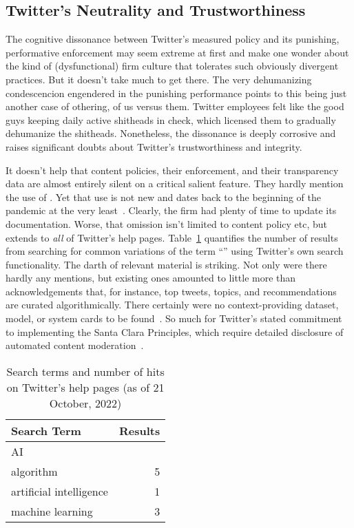 \subsection{Twitter's Neutrality and Trustworthiness}
\label{sec:trusting-twitter}

The cognitive dissonance between Twitter's measured policy and its punishing,
performative enforcement may seem extreme at first and make one wonder about the
kind of (dysfunctional) firm culture that tolerates such obviously divergent
practices. But it doesn't take much to get there. The very dehumanizing
condescencion engendered in the punishing performance points to this being just
another case of othering, of us versus them. Twitter employees felt like the
good guys keeping daily active shitheads in check, which licensed them to
gradually dehumanize the shitheads. Nonetheless, the dissonance is deeply
corrosive and raises significant doubts about Twitter's trustworthiness and
integrity.

It doesn't help that content policies, their enforcement, and their transparency
data are almost entirely silent on a critical salient feature. They hardly
mention the use of . Yet that use is not new and dates back to the
beginning of the pandemic at the very least~\cite{ScottKayali2020}. Clearly, the
firm had plenty of time to update its documentation. Worse, that omission isn't
limited to content policy etc, but extends to \emph{all} of Twitter's help
pages. Table~\ref{table:search} quantifies the number of results from searching
for common variations of the term ``'' using Twitter's own search
functionality. The darth of relevant material is striking. Not only were there
hardly any mentions, but existing ones amounted to little more than
acknowledgements that, for instance, top tweets, topics, and recommendations are
curated algorithmically. There certainly were no context-providing dataset,
model, or system cards to be
found~\cite{GebruMorgensternea2021,MitchellWuea2019,ProcopeCheemaea2022}. So
much for Twitter's stated commitment to
implementing the Santa Clara Principles, which require detailed disclosure of
automated content
moderation~\cite{AccessNowACLUFoundationOfNorthernCaliforniaea2021}.

\begin{table}
\caption{Search terms and number of hits on Twitter's help pages (as of 21
    October, 2022)}
\label{table:search}
\libertineLF
\begin{tabular}{lr}
\textbf{Search Term} & \textbf{Results} \B \\ \hline
AI & \T0 \\
algorithm & 5 \\
artificial intelligence & 1 \\
machine learning & 3 \\
\end{tabular}
\end{table}

